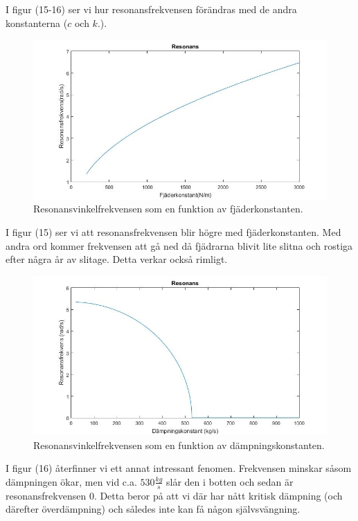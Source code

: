 \documentclass[10pt,a4paper]{article}
\begin{document}
I figur (15-16) ser vi hur resonansfrekvensen förändras med de andra konstanterna ($c$ och $k.$).
\begin{figure}[h]
\begin{center}
\includegraphics[scale=0.4]{resonansFjader}
\caption{Resonansvinkelfrekvensen som en funktion av fjäderkonstanten.}
\end{center}
\end{figure}
I figur (15) ser vi att resonansfrekvensen blir högre med fjäderkonstanten. Med andra ord kommer frekvensen att gå ned då fjädrarna blivit lite slitna och rostiga efter några år av slitage. Detta verkar också rimligt.
\begin{figure}[h]
\begin{center}
\includegraphics[scale=0.4]{resonansDamp}
\caption{Resonansvinkelfrekvensen som en funktion av dämpningskonstanten.}
\end{center}
\end{figure}
I figur (16) återfinner vi ett annat intressant fenomen. Frekvensen minskar såsom dämpningen ökar, men vid c.a. $530\frac{kg}{s}$ slår den i botten och sedan är resonansfrekvensen $0$. Detta beror på att vi där har nått kritisk dämpning (och därefter överdämpning) och således inte kan få någon självsvängning.
\end{document}
